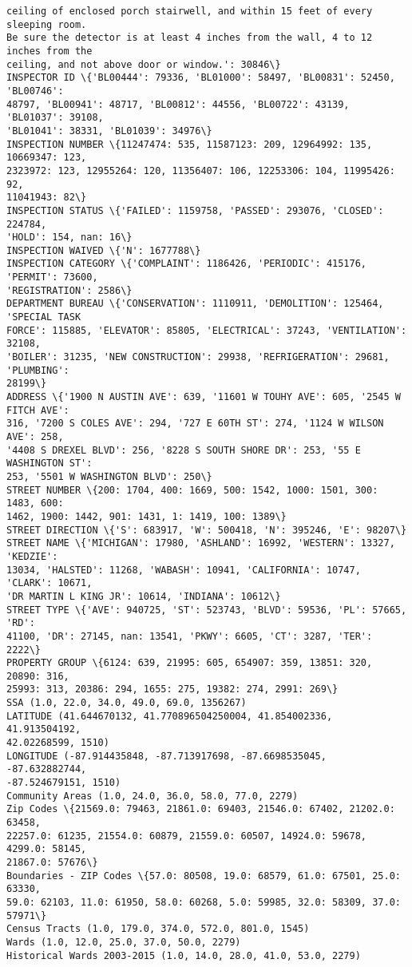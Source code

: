 \documentclass[11pt]{article}
\begin{document}
\begin{Verbatim}[commandchars=\\\{\}]
ceiling of enclosed porch stairwell, and within 15 feet of every sleeping room.
Be sure the detector is at least 4 inches from the wall, 4 to 12 inches from the
ceiling, and not above door or window.': 30846\}
INSPECTOR ID \{'BL00444': 79336, 'BL01000': 58497, 'BL00831': 52450, 'BL00746':
48797, 'BL00941': 48717, 'BL00812': 44556, 'BL00722': 43139, 'BL01037': 39108,
'BL01041': 38331, 'BL01039': 34976\}
INSPECTION NUMBER \{11247474: 535, 11587123: 209, 12964992: 135, 10669347: 123,
2323972: 123, 12955264: 120, 11356407: 106, 12253306: 104, 11995426: 92,
11041943: 82\}
INSPECTION STATUS \{'FAILED': 1159758, 'PASSED': 293076, 'CLOSED': 224784,
'HOLD': 154, nan: 16\}
INSPECTION WAIVED \{'N': 1677788\}
INSPECTION CATEGORY \{'COMPLAINT': 1186426, 'PERIODIC': 415176, 'PERMIT': 73600,
'REGISTRATION': 2586\}
DEPARTMENT BUREAU \{'CONSERVATION': 1110911, 'DEMOLITION': 125464, 'SPECIAL TASK
FORCE': 115885, 'ELEVATOR': 85805, 'ELECTRICAL': 37243, 'VENTILATION': 32108,
'BOILER': 31235, 'NEW CONSTRUCTION': 29938, 'REFRIGERATION': 29681, 'PLUMBING':
28199\}
ADDRESS \{'1900 N AUSTIN AVE': 639, '11601 W TOUHY AVE': 605, '2545 W FITCH AVE':
316, '7200 S COLES AVE': 294, '727 E 60TH ST': 274, '1124 W WILSON AVE': 258,
'4408 S DREXEL BLVD': 256, '8228 S SOUTH SHORE DR': 253, '55 E WASHINGTON ST':
253, '5501 W WASHINGTON BLVD': 250\}
STREET NUMBER \{200: 1704, 400: 1669, 500: 1542, 1000: 1501, 300: 1483, 600:
1462, 1900: 1442, 901: 1431, 1: 1419, 100: 1389\}
STREET DIRECTION \{'S': 683917, 'W': 500418, 'N': 395246, 'E': 98207\}
STREET NAME \{'MICHIGAN': 17980, 'ASHLAND': 16992, 'WESTERN': 13327, 'KEDZIE':
13034, 'HALSTED': 11268, 'WABASH': 10941, 'CALIFORNIA': 10747, 'CLARK': 10671,
'DR MARTIN L KING JR': 10614, 'INDIANA': 10612\}
STREET TYPE \{'AVE': 940725, 'ST': 523743, 'BLVD': 59536, 'PL': 57665, 'RD':
41100, 'DR': 27145, nan: 13541, 'PKWY': 6605, 'CT': 3287, 'TER': 2222\}
PROPERTY GROUP \{6124: 639, 21995: 605, 654907: 359, 13851: 320, 20890: 316,
25993: 313, 20386: 294, 1655: 275, 19382: 274, 2991: 269\}
SSA (1.0, 22.0, 34.0, 49.0, 69.0, 1356267)
LATITUDE (41.644670132, 41.770896504250004, 41.854002336, 41.913504192,
42.02268599, 1510)
LONGITUDE (-87.914435848, -87.713917698, -87.6698535045, -87.632882744,
-87.524679151, 1510)
Community Areas (1.0, 24.0, 36.0, 58.0, 77.0, 2279)
Zip Codes \{21569.0: 79463, 21861.0: 69403, 21546.0: 67402, 21202.0: 63458,
22257.0: 61235, 21554.0: 60879, 21559.0: 60507, 14924.0: 59678, 4299.0: 58145,
21867.0: 57676\}
Boundaries - ZIP Codes \{57.0: 80508, 19.0: 68579, 61.0: 67501, 25.0: 63330,
59.0: 62103, 11.0: 61950, 58.0: 60268, 5.0: 59985, 32.0: 58309, 37.0: 57971\}
Census Tracts (1.0, 179.0, 374.0, 572.0, 801.0, 1545)
Wards (1.0, 12.0, 25.0, 37.0, 50.0, 2279)
Historical Wards 2003-2015 (1.0, 14.0, 28.0, 41.0, 53.0, 2279)
    \end{Verbatim}
\end{document}
